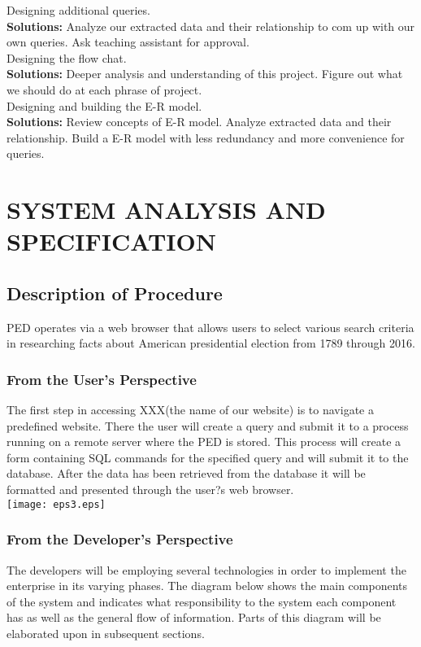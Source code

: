 \documentclass{article}
\begin{document}
 Designing additional queries.\\
{\bfseries Solutions:} Analyze our extracted data and their relationship to com up with our own queries. Ask teaching assistant for approval.\\

 Designing the flow chat.\\
{\bfseries Solutions:} Deeper analysis and understanding of this project. Figure out what we should do at each phrase of project.\\

 Designing and building the E-R model.\\
{\bfseries Solutions:} Review concepts of E-R model. Analyze extracted data and their relationship. Build a E-R model with less redundancy and more convenience for queries.\\


\section{SYSTEM ANALYSIS AND SPECIFICATION}
\subsection{Description of Procedure}
PED operates via a web browser that allows users to select various search criteria in researching facts about American presidential election from 1789 through 2016.
\subsubsection{From the User's Perspective}
The first step in accessing XXX(the name of our website) is to navigate a predefined website. There the user will create a query and submit it to a process running on a remote server where the PED is stored. This process will create a form containing SQL commands for the specified query and will submit it to the database. After the data has been retrieved from the database it will be formatted and presented through the user?s web browser.\\
\texttt{[image: eps3.eps]}
\subsubsection{From the Developer's Perspective}
The developers will be employing several technologies in order to implement the enterprise in its varying phases. The diagram below shows the main components of the system and indicates what responsibility to the system each component has as well as the general flow of information. Parts of this diagram will be elaborated upon in subsequent sections.
\end{document}
